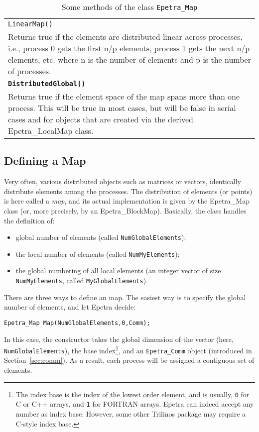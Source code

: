 \begin{table}
\begin{center}
\begin{tabular}{ | p{15cm} | }
 \verb!LinearMap()! \\
Returns true if the elements are distributed linear across processes,
i.e., process 0 gets the first n/p elements, process 1 gets the next
n/p elements, etc. where n is the number of elements and p is the number
of processes.  \\
\bf \verb!DistributedGlobal()! \\
Returns true if the element space of the map spans more than one
process. This will be true in most cases, but will be false in serial
cases and for objects that are created via the derived Epetra\_LocalMap
class.  \\
\hline
\end{tabular}
\caption{Some methods of the class {\tt Epetra\_Map}}
\label{tab:epetra_map}
\end{center}
\end{table}


\subsection{Defining a Map}
\label{sec:map}

Very often, various distributed objects such as matrices or vectors,
identically distribute elements among the processes.  The distribution
of elements (or points) is here called a {\sl map}, and its actual
implementation is given by the Epetra\_Map class (or, more precisely, by
an Epetra\_BlockMap).  Basically, the class handles the definition of:
\begin{itemize}
\item global number of elements (called \verb!NumGlobalElements!);
\item the local number of elements (called \verb!NumMyElements!);
\item the global numbering of all local elements (an integer vector of size
  \verb!NumMyElements!, called \verb!MyGlobalElements!).
\end{itemize}

There are  three ways to define an map. The easiest way is to
specify the global number of elements, and let Epetra decide:
\begin{verbatim}
Epetra_Map Map(NumGlobalElements,0,Comm);
\end{verbatim}
In this case, the constructor takes the global dimension of the vector
(here, \verb!NumGlobalElements!), the base index\footnote{The index base
  is the index of the lowest order element, and is usually, {\tt 0} for
  C or C++ arrays, and {\tt 1} for FORTRAN arrays. Epetra can indeed
  accept any number as index base. However, some other Trilinos package
  may require a C-style index base.}, and an \verb!Epetra_Comm!  object
(introduced in Section~\ref{sec:comm}). As a result, each process will
be assigned a contiguous set of elements.

